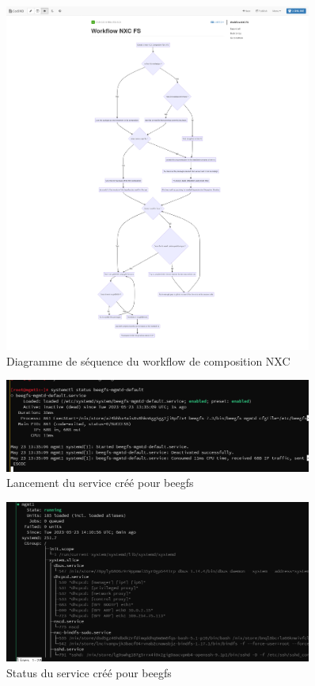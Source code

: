 \documentclass[a4paper,french,12pt, titlepage]{article}
\begin{document}
\begin{figure}
\centering
\includegraphics[width=0.9\textwidth,height=0.9\textheight,keepaspectratio]{annexe/workflowpre.png}
\caption{Diagramme de séquence du workflow de composition NXC}
\end{figure}

\begin{figure}
\centering
\includegraphics[width=0.9\textwidth,height=0.9\textheight,keepaspectratio]{annexe/beegfs_service.png}
\caption{Lancement du service créé pour beegfs}
\end{figure}

\begin{figure}
\centering
\includegraphics[width=0.9\textwidth,height=0.9\textheight,keepaspectratio]{annexe/beegfs_service_yes.png}
\caption{Status du service créé pour beegfs}
\end{figure}
\end{document}

